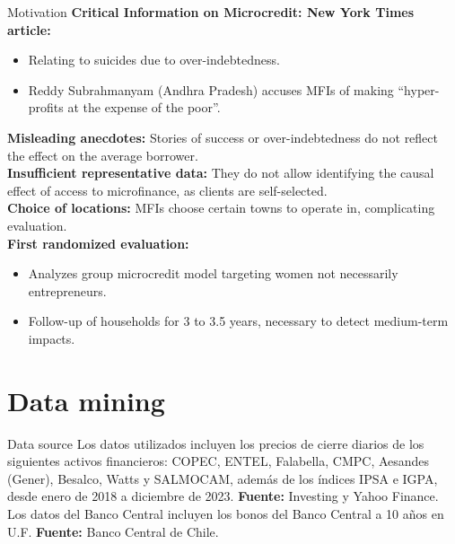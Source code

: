 \documentclass[10pt]{beamer}
\begin{document}
\begin{frame}{Motivation}
\justifying
\textbf{Critical Information on Microcredit: New York Times article:}
\begin{itemize}
\item Relating to suicides due to over-indebtedness.\\
\item Reddy Subrahmanyam (Andhra Pradesh) accuses MFIs of making “hyper-profits at the expense of the poor”.
\end{itemize}
\vspace{\baselineskip}
\textbf{Misleading anecdotes:} Stories of success or over-indebtedness do not reflect the effect on the average borrower.\\
\textbf{Insufficient representative data:} They do not allow identifying the causal effect of access to microfinance, as clients are self-selected.\\
\textbf{Choice of locations:} MFIs choose certain towns to operate in, complicating evaluation.\\
\vspace{\baselineskip}
\textbf{First randomized evaluation:}
\begin{itemize}
    \justifying
    \item Analyzes group microcredit model targeting women not necessarily entrepreneurs.\\
\item Follow-up of households for 3 to 3.5 years, necessary to detect medium-term impacts.
\end{itemize}

\end{frame}
	
\section{Data mining}
\begin{frame}{Data source}
        \justifying
        Los datos utilizados incluyen los precios de cierre diarios de los siguientes activos financieros: COPEC, ENTEL, Falabella, CMPC, Aesandes (Gener), Besalco, Watts y SALMOCAM, además de los índices IPSA e IGPA, desde enero de 2018 a diciembre de 2023. \textbf{Fuente:} Investing y Yahoo Finance.\\
        \vspace{\baselineskip} %
        Los datos del Banco Central incluyen los bonos del Banco Central a 10 años en U.F. \textbf{Fuente:} Banco Central de Chile.
\end{frame}
\end{document}
